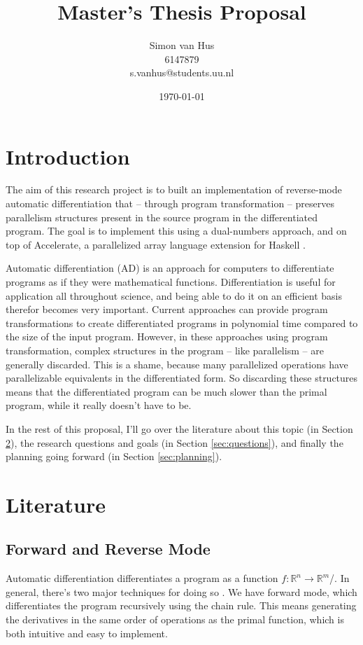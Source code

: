 \documentclass[a4paper]{article}
\title{Master's Thesis Proposal}
\author{Simon van Hus\\6147879\\s.vanhus@students.uu.nl}
\date{\today}
\begin{document}
    \maketitle

    \section{Introduction} \label{sec:introduction}
        The aim of this research project is to built an implementation of reverse-mode automatic differentiation that -- through program transformation -- preserves parallelism structures present in the source program in the differentiated program.
        The goal is to implement this using a dual-numbers approach, and on top of Accelerate, a parallelized array language extension for Haskell \cite{haskell}.

        Automatic differentiation (AD) is an approach for computers to differentiate programs as if they were mathematical functions.
        Differentiation is useful for application all throughout science, and being able to do it on an efficient basis therefor becomes very important.
        Current approaches can provide program transformations to create differentiated programs in polynomial time compared to the size of the input program.
        However, in these approaches using program transformation, complex structures in the program -- like parallelism -- are generally discarded.
        This is a shame, because many parallelized operations have parallelizable equivalents in the differentiated form.
        So discarding these structures means that the differentiated program can be much slower than the primal program, while it really doesn't have to be.

        In the rest of this proposal, I'll go over the literature about this topic (in Section \ref{sec:literature}), the research questions and goals (in Section \ref{sec:questions}), and finally the planning going forward (in Section \ref{sec:planning}).

    \section{Literature} \label{sec:literature}
        \subsection{Forward and Reverse Mode}
            Automatic differentiation differentiates a program as a function $f:\mathbb{R}^n\to\mathbb{R}^m$/.
            In general, there's two major techniques for doing so \cite{margossian2019review, elliot2018essence}.
            We have forward mode, which differentiates the program recursively using the chain rule.
            This means generating the derivatives in the same order of operations as the primal function, which is both intuitive and easy to implement.
\end{document}
